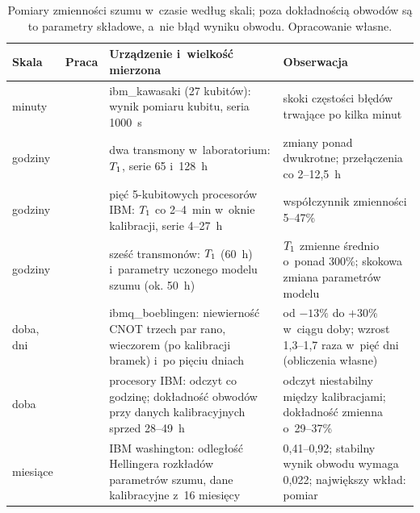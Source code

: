 \begin{table}[tb]
\centering
\caption[Pomiary zmienności szumu w~czasie]{Pomiary zmienności szumu w~czasie według skali; poza dokładnością obwodów są to parametry składowe, a~nie błąd wyniku obwodu. Opracowanie własne.}
\label{tab:lr:noise:time}
\footnotesize
\setlength{\tabcolsep}{3pt}
\newcommand{\lrc}[1]{\raggedright\hspace{0pt}#1}
\begin{tabular}{@{}p{1.4cm}p{1.1cm}p{6.6cm}p{6.2cm}@{}}
\toprule
\lrc{\textbf{Skala}} & \lrc{\textbf{Praca}} & \lrc{\textbf{Urządzenie i~wielkość mierzona}} & \lrc{\textbf{Obserwacja}} \tabularnewline
\midrule
\lrc{minuty} & \lrc{\cite{hirasaki_detection_2023}} & \lrc{ibm\_kawasaki (27 kubitów): wynik pomiaru kubitu, seria 1000~s} & \lrc{skoki częstości błędów trwające po kilka minut} \tabularnewline
\lrc{godziny} & \lrc{\cite{burnett_decoherence_2019}} & \lrc{dwa transmony w~laboratorium: $T_1$, serie 65 i~128~h} & \lrc{zmiany ponad dwukrotne; przełączenia co 2--12,5~h} \tabularnewline
\lrc{godziny} & \lrc{\cite{etxezarreta_multiqubit_2023}} & \lrc{pięć 5-kubitowych procesorów IBM: $T_1$ co 2--4~min w~oknie kalibracji, serie 4--27~h} & \lrc{współczynnik zmienności 5--47\%} \tabularnewline
\lrc{godziny} & \lrc{\cite{kim_error_2025}} & \lrc{sześć transmonów: $T_1$ (60~h) i~parametry uczonego modelu szumu (ok. 50~h)} & \lrc{$T_1$ zmienne średnio o~ponad 300\%; skokowa zmiana parametrów modelu} \tabularnewline
\lrc{doba, dni} & \lrc{\cite{yeter-aydeniz_measuring_2023}} & \lrc{ibmq\_boeblingen: niewierność CNOT trzech par rano, wieczorem (po kalibracji bramek) i~po pięciu dniach} & \lrc{od $-13\%$ do $+30\%$ w~ciągu doby; wzrost 1,3--1,7 raza w~pięć dni (obliczenia własne)} \tabularnewline
\lrc{doba} & \lrc{\cite{wilson_just-in-time_2020}} & \lrc{procesory IBM: odczyt co godzinę; dokładność obwodów przy danych kalibracyjnych sprzed 28--49~h} & \lrc{odczyt niestabilny między kalibracjami; dokładność zmienna o~29--37\%} \tabularnewline
\lrc{miesiące} & \lrc{\cite{dasgupta_impact_2024}} & \lrc{IBM washington: odległość Hellingera rozkładów parametrów szumu, dane kalibracyjne z~16 miesięcy} & \lrc{0,41--0,92; stabilny wynik obwodu wymaga 0,022; największy wkład: pomiar} \tabularnewline
\bottomrule
\end{tabular}
\end{table}


